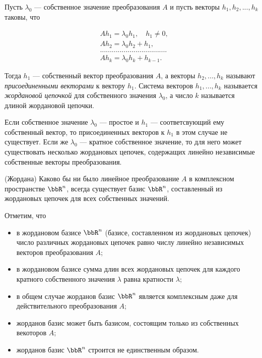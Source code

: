 \begin{defn}
Пусть $\lambda_0$ --- собственное значение преобразования $A$ и пусть векторы $h_1,h_2,...,h_k$ таковы, что 

\begin{equation} \label{27eq2.3}
\begin{aligned}
&Ah_1=\lambda_0h_1,\quad h_1\neq 0,\\
&Ah_2=\lambda_0h_2+h_1,\\
&..................................\\
&Ah_k=\lambda_0h_k+h_{k-1}.
\end{aligned}
\end{equation}

Тогда $h_1$ --- собственный вектор преобразования $A$, а векторы $h_2,...,h_k$ называют \textit{присоединенными векторами} к вектору $h_1$. Система векторов $h_1,...,h_k$ называется \textit{жордановой цепочкой} для собственного значения $\lambda_0$, а число $k$ называется длиной жордановой цепочки.

Если собственное значение $\lambda_0$ --- простое и $h_1$ --- соответсвующий ему собственный вектор, то присоединенных векторов к $h_1$ в этом случае не существует. Если же $\lambda_0$ --- кратное собственное значение, то для него может существовать несколько жордановых цепочек, содержащих линейно независимые собственные векторы преобразования.   

\end{defn}

\begin{thm}\label{27thmJ} (Жордана)
Каково бы ни было линейное преобразование $A$ в комплексном пространстве $\bbR^n$, всегда существует базис $\bbR^n$, составленный из жордановых цепочек для всех собственных значений.
\end{thm}

Отметим, что 
\begin{itemize} 
\item в жордановом базисе $\bbR^n$ (базисе, составленном из жордановых цепочек) число различных жордановых цепочек равно числу линейно независимых векторов преобразования $A$;
\item в жордановом базисе сумма длин всех жордановых цепочек для каждого кратного собственного значения $\lambda$ равна кратности $\lambda$;
\item в общем случае жорданов базис $\bbR^n$ является комплексным даже для действительного преобразования $A$;
\item жорданов базис может быть базисом, состоящим только из собственных векоторов $A$;
\item жорданов базис $\bbR^n$ строится не единственным образом.
\end{itemize}

